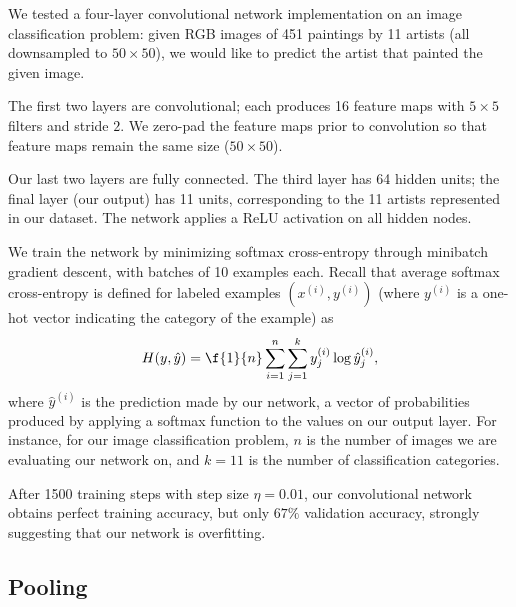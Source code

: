 \documentclass{article}
\newcommand{\sind}[1]{^{(#1)}}
\begin{document}
\begin{multicols}{2}
We tested a four-layer convolutional network implementation
on an image classification problem:
given RGB images of 451 paintings by 11 artists
(all downsampled to $50\times 50$),
we would like to predict the artist that painted the given image.

The first two layers are convolutional;
each produces 16 feature maps
with $5\times 5$ filters and stride $2$.
We zero-pad the feature maps prior to convolution
so that feature maps remain the same size ($50\times 50$).

Our last two layers are fully connected.
The third layer has 64 hidden units;
the final layer (our output) has 11 units,
corresponding to the 11 artists represented in our dataset.
The network applies a ReLU activation on all hidden nodes.

We train the network by minimizing softmax cross-entropy
through minibatch gradient descent,
with batches of 10 examples each.
Recall that average softmax cross-entropy is defined
for labeled examples $(x\sind{i}, y\sind{i})$
(where $y\sind{i}$ is a one-hot vector indicating the category of the example)
as
\begin{equation}
    H(y, \hat y) = \f{1}{n}\sum_{i=1}^n
                             \sum_{j=1}^k
                               y\sind{i}_j \log \hat y\sind{i}_j,
\end{equation}
where $\hat y\sind{i}$ is the prediction made by our network,
a vector of probabilities
produced by applying a softmax function
to the values on our output layer.
For instance, for our image classification problem,
$n$ is the number of images we are evaluating our network on,
and $k=11$ is the number of classification categories.

After 1500 training steps with step size $\eta = 0.01$,
our convolutional network obtains perfect training accuracy,
but only $67\%$ validation accuracy,
strongly suggesting that our network is overfitting.

\subsection{Pooling}


\end{multicols}
\end{document}
